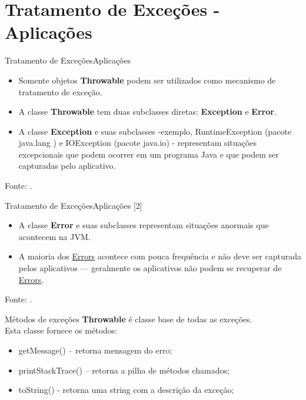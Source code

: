 \documentclass[11pt,aspectratio=43,ignorenonframetext,t]{beamer}
\begin{document}
\section{Tratamento de Exceções - Aplicações}
\begin{frame}{Tratamento de Exceções}{Aplicações}
\begin{itemize}
    \item Somente objetos \textbf{Throwable} podem ser utilizados como mecanismo de tratamento de exceção. 
    \item A classe \textbf{Throwable} tem duas subclasses diretas: \textbf{Exception} e \textbf{Error}. 
    \item A classe \textbf{Exception} e suas subclasses -exemplo, RuntimeException (pacote java.lang ) e IOException (pacote java.io) - representam situações excepcionais que podem ocorrer em um programa Java e que podem ser capturadas pelo aplicativo. 
\end{itemize}
\tiny{Fonte: \cite{deitel2017java}}.
\end{frame}
\begin{frame}{Tratamento de Exceções}{Aplicações [2]}
\begin{itemize} 
    \item A classe \textbf{Error} e suas subclasses representam situações anormais que acontecem na JVM. 
    \item A maioria dos \underline{Errors} acontece com pouca frequência e não deve ser capturada pelos aplicativos — geralmente os aplicativos não podem se recuperar de \underline{Errors}.
\end{itemize}
\tiny{Fonte: \cite{deitel2017java}}.
\end{frame}
\begin{frame}{Métodos de exceções}
\textbf{Throwable} é classe base de todas as exceções. \\
Esta classe fornece os métodos:
\begin{itemize}
    \item getMessage() – retorna mensagem do erro;
    \item printStackTrace() – retorna a pilha de métodos chamados;
    \item toString() - retorna uma string com a descrição da exceção;
\end{itemize}
\end{frame}
\end{document}

